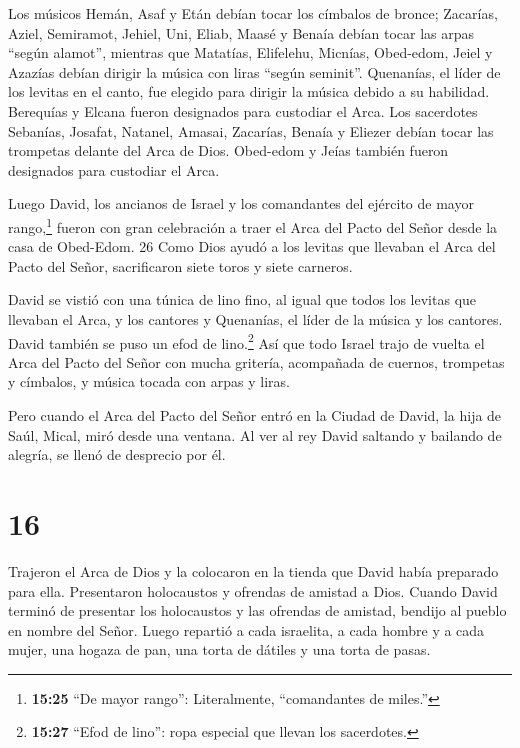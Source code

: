  Los músicos Hemán, Asaf y Etán debían tocar los címbalos
de bronce;  Zacarías, Aziel, Semiramot, Jehiel, Uni, Eliab,
Maasé y Benaía debían tocar las arpas ``según alamot'', 
mientras que Matatías, Elifelehu, Micnías, Obed-edom, Jeiel y Azazías
debían dirigir la música con liras ``según seminit''. 
Quenanías, el líder de los levitas en el canto, fue elegido para dirigir
la música debido a su habilidad.  Berequías y Elcana fueron
designados para custodiar el Arca.  Los sacerdotes
Sebanías, Josafat, Natanel, Amasai, Zacarías, Benaía y Eliezer debían
tocar las trompetas delante del Arca de Dios. Obed-edom y Jeías también
fueron designados para custodiar el Arca.

 Luego David, los ancianos de Israel y los comandantes del
ejército de mayor rango,\footnote{\textbf{15:25} ``De mayor rango'':
  Literalmente, ``comandantes de miles.''} fueron con gran celebración a
traer el Arca del Pacto del Señor desde la casa de Obed-Edom. 26 Como
Dios ayudó a los levitas que llevaban el Arca del Pacto del Señor,
sacrificaron siete toros y siete carneros.

 David se vistió con una túnica de lino fino, al igual que
todos los levitas que llevaban el Arca, y los cantores y Quenanías, el
líder de la música y los cantores. David también se puso un efod de
lino.\footnote{\textbf{15:27} ``Efod de lino'': ropa especial que llevan
  los sacerdotes.}  Así que todo Israel trajo de vuelta el
Arca del Pacto del Señor con mucha gritería, acompañada de cuernos,
trompetas y címbalos, y música tocada con arpas y liras.

 Pero cuando el Arca del Pacto del Señor entró en la Ciudad
de David, la hija de Saúl, Mical, miró desde una ventana. Al ver al rey
David saltando y bailando de alegría, se llenó de desprecio por él.

\hypertarget{section-15}{%
\section{16}\label{section-15}}

 Trajeron el Arca de Dios y la colocaron en la tienda que
David había preparado para ella. Presentaron holocaustos y ofrendas de
amistad a Dios.  Cuando David terminó de presentar los
holocaustos y las ofrendas de amistad, bendijo al pueblo en nombre del
Señor.  Luego repartió a cada israelita, a cada hombre y a
cada mujer, una hogaza de pan, una torta de dátiles y una torta de
pasas.

